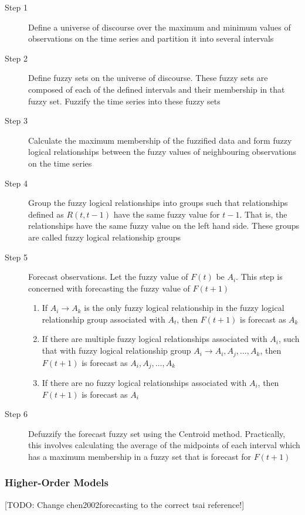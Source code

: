 \documentclass{article}
\theoremstyle{definition}
\begin{document}
\begin{description}
\item[Step 1] Define a universe of discourse over the maximum and minimum values of observations on the time series and partition it into several intervals
\item[Step 2] Define fuzzy sets on the universe of discourse. These fuzzy sets are composed of each of the defined intervals and their membership in that fuzzy set. Fuzzify the time series into these fuzzy sets
\item[Step 3] Calculate the maximum membership of the fuzzified data and form fuzzy logical relationships between the fuzzy values of neighbouring observations on the time series
\item[Step 4] Group the fuzzy logical relationships into groups such that relationships defined as $R(t,t-1)$ have the same fuzzy value for $t-1$. That is, the relationships have the same fuzzy value on the left hand side. These groups are called fuzzy logical relationship groups
\item[Step 5] Forecast observations. Let the fuzzy value of $F(t)$ be $A_i$. This step is concerned with forecasting the fuzzy value of $F(t+1)$
\begin{enumerate}
\item If  $A_i \rightarrow A_k$ is the only fuzzy logical relationship in the fuzzy logical relationship group associated with $A_t$, then $F(t+1)$ is forecast as $A_k$ 
\item If there are multiple fuzzy logical relationships associated with $A_i$, such that with fuzzy logical relationship group $A_i \rightarrow A_{i}, A_{j}, \ldots, A_{k}$, then $F(t+1)$ is forecast as $A_{i}, A_{j}, \ldots, A_{k}$
\item If there are no fuzzy logical relationships associated with $A_i$, then $F(t+1)$ is forecast as $A_i$
\end{enumerate}
\item[Step 6] Defuzzify the forecast fuzzy set using the Centroid method. Practically, this involves calculating the average of the midpoints of each interval which has a maximum membership in a fuzzy set that is forecast for $F(t+1)$
\end{description}

\subsubsection{Higher-Order Models}

[TODO: Change chen2002forecasting to the correct tsai reference!]
\end{document}
